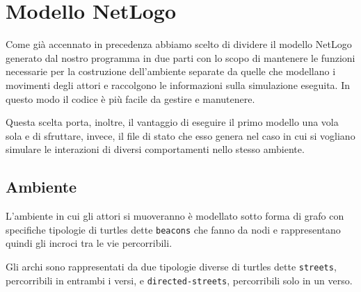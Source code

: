 \section{Modello NetLogo}
\label{sec:modello-netlogo}

Come già accennato in precedenza abbiamo scelto di dividere il modello NetLogo generato dal nostro programma in due parti con lo scopo di mantenere le funzioni necessarie per la costruzione dell'ambiente separate da quelle che modellano i movimenti degli attori e raccolgono le informazioni sulla simulazione eseguita. In questo modo il codice è più facile da gestire e manutenere.

Questa scelta porta, inoltre, il vantaggio di eseguire il primo modello una vola sola e di sfruttare, invece, il file di stato che esso genera nel caso in cui si vogliano simulare le interazioni di diversi comportamenti nello stesso ambiente.
\subsection{Ambiente}
L'ambiente in cui gli attori si muoveranno è modellato sotto forma di grafo con specifiche tipologie di turtles dette \texttt{beacons} che fanno da nodi e rappresentano quindi gli incroci tra le vie percorribili.

Gli archi sono rappresentati da due tipologie diverse di turtles dette \texttt{streets}, percorribili in entrambi i versi, e \texttt{directed-streets}, percorribili solo in un verso.

